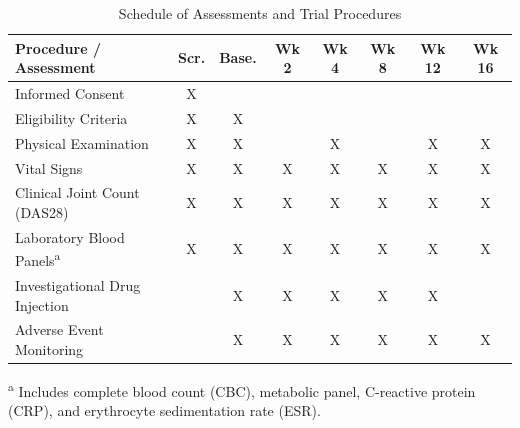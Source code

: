 \begin{table}[H]
\centering
\caption{Schedule of Assessments and Trial Procedures}
\label{tab:procedures}
\begin{small}
\begin{tabularx}{\textwidth}{Xccccccc}
\toprule
\textbf{Procedure / Assessment} & \textbf{Scr.} & \textbf{Base.} & \textbf{Wk 2} & \textbf{Wk 4} & \textbf{Wk 8} & \textbf{Wk 12} & \textbf{Wk 16} \\
\midrule
Informed Consent & X & & & & & & \\
Eligibility Criteria & X & X & & & & & \\
Physical Examination & X & X & & X & & X & X \\
Vital Signs & X & X & X & X & X & X & X \\
Clinical Joint Count (DAS28) & X & X & X & X & X & X & X \\
Laboratory Blood Panels\textsuperscript{a} & X & X & X & X & X & X & X \\
Investigational Drug Injection & & X & X & X & X & X & \\
Adverse Event Monitoring & & X & X & X & X & X & X \\
\bottomrule
\end{tabularx}
\end{small}
\begin{flushleft}
\footnotesize \textsuperscript{a} Includes complete blood count (CBC), metabolic panel, C-reactive protein (CRP), and erythrocyte sedimentation rate (ESR).
\end{flushleft}
\end{table}
